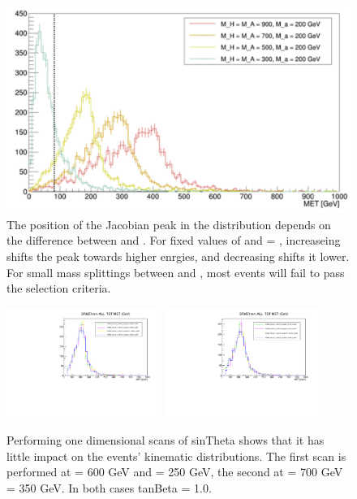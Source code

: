 \begin{figure}
\includegraphics[width=\textwidth]{texinputs/04_grid/figures/monoz/leptonic/mA_Scan.pdf}
\caption{The position of the Jacobian peak in the \MET distribution depends on the difference between \mH and \ma.  For fixed values of \ma and \mA = \mH, increaseing \mA shifts the peak towards higher enrgies, and decreasing \mA shifts it lower.  For small mass splittings between \mH and \ma, most events will fail to pass the \MET selection criteria.}   
\end{figure}

\begin{figure}
\includegraphics[width=0.45\textwidth]{texinputs/04_grid/figures/monoz/leptonic/SinThetaScan_mH600ma250_MET.pdf}
\includegraphics[width=0.45\textwidth]{texinputs/04_grid/figures/monoz/leptonic/SinThetaScan_mH700ma350_MET.pdf}
\caption{Performing one dimensional scans of sinTheta shows that it has little impact on the events' kinematic distributions.  The first scan is performed at \mA = 600 GeV and \ma = 250 GeV, the second at \mA = 700 GeV \ma = 350 GeV.  In both cases tanBeta = 1.0.}
\end{figure}


